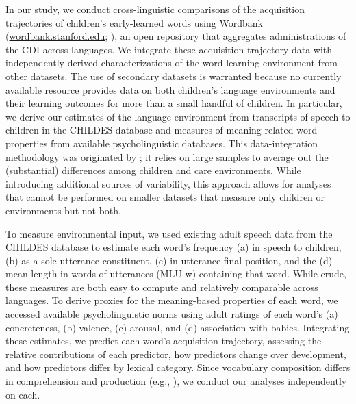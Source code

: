 \documentclass[
   11pt,
       ]{book}
\begin{document}
In our study, we conduct cross-linguistic comparisons of the acquisition trajectories of children's early-learned words using Wordbank (\href{http://wordbank.stanford.edu}{wordbank.stanford.edu}; \citealp{frank2017}), an open repository that aggregates administrations of the CDI across languages. We integrate these acquisition trajectory data with independently-derived characterizations of the word learning environment from other datasets. The use of secondary datasets is warranted because no currently available resource provides data on both children's language environments and their learning outcomes for more than a small handful of children. In particular, we derive our estimates of the language environment from transcripts of speech to children in the CHILDES database \citep{macwhinney2000} and measures of meaning-related word properties from available psycholinguistic databases. This data-integration methodology was originated by \citet{goodman2008}; it relies on large samples to average out the (substantial) differences among children and care environments. While introducing additional sources of variability, this approach allows for analyses that cannot be performed on smaller datasets that measure only children or environments but not both.

To measure environmental input, we used existing adult speech data from the CHILDES database to estimate each word's frequency (a) in speech to children, (b) as a sole utterance constituent, (c) in utterance-final position, and the (d) mean length in words of utterances (MLU-w) containing that word. While crude, these measures are both easy to compute and relatively comparable across languages. To derive proxies for the meaning-based properties of each word, we accessed available psycholinguistic norms using adult ratings of each word's (a) concreteness, (b) valence, (c) arousal, and (d) association with babies. Integrating these estimates, we predict each word's acquisition trajectory, assessing the relative contributions of each predictor, how predictors change over development, and how predictors differ by lexical category. Since vocabulary composition differs in comprehension and production (e.g., \citealp{benedict1979}), we conduct our analyses independently on each.
\end{document}
